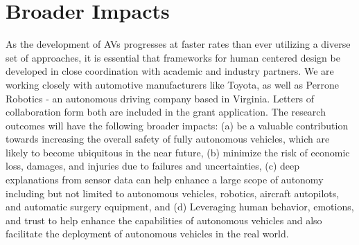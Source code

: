 

\section{Broader Impacts}
\label{sec:broader}

As the development of AVs progresses at faster rates than ever utilizing a diverse set of approaches, it is essential that frameworks for human centered design be developed in close coordination with academic and industry partners. 
We are working closely with automotive manufacturers like Toyota, as well as Perrone Robotics - an autonomous driving company based in Virginia. Letters of collaboration form both are included in the grant application.
The research outcomes will have the following broader impacts: (a) be a valuable contribution towards increasing the overall safety of fully autonomous vehicles, which are likely to become ubiquitous in the near future, (b) minimize the risk of economic loss, damages, and injuries due to failures and uncertainties, (c) deep explanations from sensor data can help enhance a large scope of autonomy including but not limited to autonomous vehicles, robotics, aircraft autopilots, and automatic surgery equipment, and (d) Leveraging human behavior, emotions, and trust to help enhance the capabilities of autonomous vehicles and also facilitate the deployment of autonomous vehicles in the real world.
